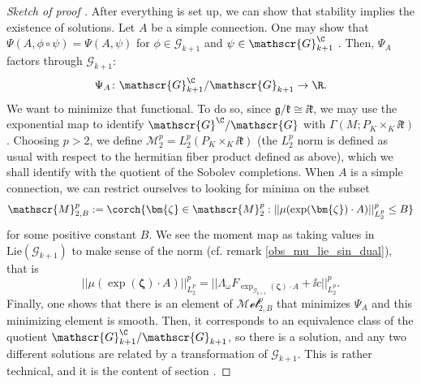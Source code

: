 \begin{proof}[\textit{Sketch of proof } \parencite{i1999hitchin}]
    After everything is set up, we can show that stability implies the existence of solutions. Let \(A\) be a simple connection. One may show that \(\Psi(A, \phi \circ  \psi)=\Psi(A, \psi)\) for \(\phi \in \mathscr{G}_{k+1}\) and \(\psi \in \mathscr{G}^\C_{k+1}\) \parencite[Prop. 3.4]{i1999hitchin}. Then, \(\Psi_A\) factors through \(\mathscr{G}_{k+1}\):
    \[
    \Psi_A\colon \mathscr{G}^\C_{k+1}/\mathscr{G}_{k+1} \to \R.
    \]
    We want to minimize that functional. To do so, since \(\mathfrak{g}/\mathfrak{k}\cong \ii \mathfrak{k}\), we may use the exponential map to identify \(\mathscr{G}^\C/\mathscr{G}\) with \(\Gamma(M;P_K \times_K \ii \mathfrak{k})\). Choosing \(p>2\), we define \(\mathscr{M}^p_2=L_2^p(P_K \times_K \ii \mathfrak{k})\) (the \(L_2^p\) norm is defined as usual with respect to the hermitian fiber product defined as above), which we shall identify with the quotient of the Sobolev completions. When \(A\) is a simple connection, we can restrict ourselves to looking for minima on the subset
    \[
    \mathscr{M}^p_{2,B}:=\corch{\bm{\zeta}\in \mathscr{M}^p_2:||\mu(\exp(\bm{\zeta})\cdot A)||^p_{L_2^p} \leq B}
    \] 
    for some positive constant \(B\). We see the moment map as taking values in \(\mathrm{Lie}(\mathscr{G}_{k+1})\) to make sense of the norm (cf. remark \ref{obs_mu_lie_sin_dual}), that is 
    \[
    ||\mu(\exp(\bm{\zeta})\cdot A)||^p_{L_2^p}=||\Lambda_\omega F_{\exp_{\mathscr{G}_{k+1}}(\bm{\zeta})\cdot A}+\ii c||_{L_2^p}^p.
    \] 
    Finally, one shows that there is an element of \(\mathscr{Met}^p_{2,B}\) that minimizes \(\Psi_A\) and this minimizing element is smooth. Then, it corresponds to an equivalence class of the quotient \(\mathscr{G}^\C_{k+1}/\mathscr{G}_{k+1}\), so there is a solution, and any two different solutions are related by a transformation of \(\mathscr{G}_{k+1}\). This is rather technical, and it is the content of section \parencite[Sec. 6.2]{i1999hitchin}.   


\end{proof}
